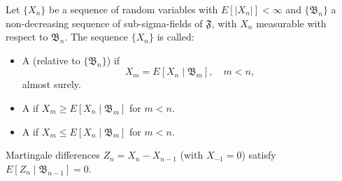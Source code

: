 Let $\{X_n\}$ be a sequence of random variables with $E[|X_n|] < \infty$ and $\{\mathfrak{B}_n\}$ a non-decreasing sequence of sub-sigma-fields of $\mathfrak{F}$, with $X_n$ measurable with respect to $\mathfrak{B}_n$. The sequence $\{X_n\}$ is called:

\begin{itemize}
\item A  (relative to $\{\mathfrak{B}_n\}$) if
  $$X_m = E[X_n \mid \mathfrak{B}_m], \quad m < n,$$
  almost surely.

\item A  if $X_m \geq E[X_n \mid \mathfrak{B}_m]$ for $m < n$.

\item A  if $X_m \leq E[X_n \mid \mathfrak{B}_m]$ for $m < n$.
\end{itemize}

Martingale differences $Z_n = X_n - X_{n-1}$ (with $X_{-1} = 0$) satisfy $E[Z_n \mid \mathfrak{B}_{n-1}] = 0$.
